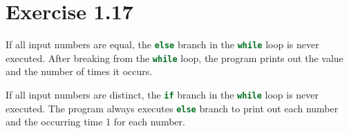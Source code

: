 \documentclass{article}
\begin{document}
\section*{Exercise 1.17}

\begin{flushleft}
If all input numbers are equal, the \lstinline[language=C++]|else| branch in
the \lstinline[language=C++]|while| loop is never executed. After breaking
from the \lstinline[language=C++]|while| loop, the program prints out the 
value and the number of times it occurs.

If all input numbers are distinct, the \lstinline[language=C++]|if| branch in
the \lstinline[language=C++]|while| loop is never executed. The program always
executes \lstinline[language=C++]|else| branch to print out each number and the
occurring time 1 for each number.
\end{flushleft}
\end{document}
